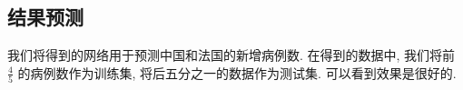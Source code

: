 \documentclass[UTF8]{ctexart}
\begin{document}
	\subsection*{结果预测}
	我们将得到的网络用于预测中国和法国的新增病例数. 在得到的数据中, 我们将前 $\frac{4}{5}$ 的病例数作为训练集, 将后五分之一的数据作为测试集. 可以看到效果是很好的.
	\begin{figure}[htbp]
	    \centering
		\;
		\centering
	\end{figure}
\end{document}
